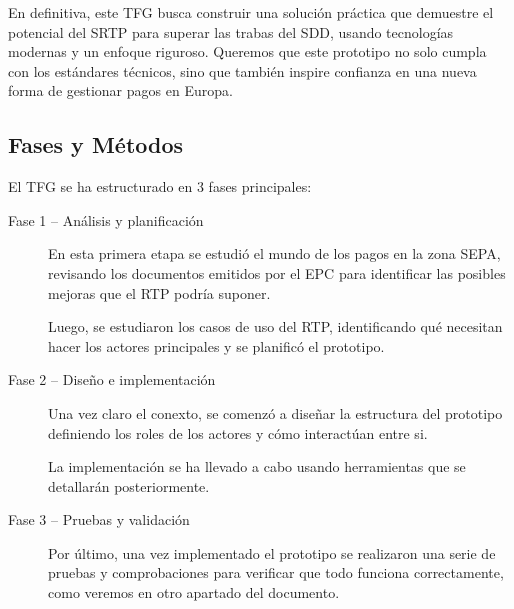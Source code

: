 En definitiva, este TFG busca construir una solución práctica que demuestre el potencial del SRTP para superar las trabas del SDD, usando tecnologías modernas y un enfoque riguroso. Queremos que este prototipo no solo cumpla con los estándares técnicos, sino que también inspire confianza en una nueva forma de gestionar pagos en Europa.

\subsection{Fases y Métodos}
\label{subsec:FasesMetodos}
El TFG se ha estructurado en 3 fases principales:

\begin{description}
  \item[Fase 1 – Análisis y planificación]%
      En esta primera etapa se estudió el mundo de los pagos en la zona SEPA, revisando los documentos emitidos por el EPC para identificar las posibles mejoras que el RTP podría suponer.
      
      Luego, se estudiaron los casos de uso del RTP, identificando qué necesitan hacer los actores principales y se planificó el prototipo.
  \item[Fase 2 – Diseño e implementación]%
      Una vez claro el conexto, se comenzó a diseñar la estructura del prototipo definiendo los roles de los actores y cómo interactúan entre si.

      La implementación se ha llevado a cabo usando herramientas que se detallarán posteriormente.
  \item[Fase 3 – Pruebas y validación]%
      Por último, una vez implementado el prototipo se realizaron una serie de pruebas y comprobaciones para verificar que todo funciona correctamente, como veremos en otro apartado del documento.
\end{description}

